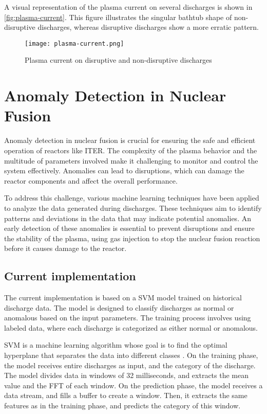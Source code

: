 A visual representation of the plasma current on several discharges is shown in \autoref{fig:plasma-current}. This figure illustrates the singular bathtub shape of non-disruptive discharges, whereas disruptive discharges show a more erratic pattern.

\begin{figure}[H]
    \centering
    \texttt{[image: plasma-current.png]}
    \caption{Plasma current on disruptive and non-disruptive discharges}
    \label{fig:plasma-current}
\end{figure}

\section{Anomaly Detection in Nuclear Fusion}

Anomaly detection in nuclear fusion is crucial for ensuring the safe and efficient operation of reactors like \ac{ITER}. The complexity of the plasma behavior and the multitude of parameters involved make it challenging to monitor and control the system effectively. Anomalies can lead to disruptions, which can damage the reactor components and affect the overall performance.

To address this challenge, various machine learning techniques have been applied to analyze the data generated during discharges. These techniques aim to identify patterns and deviations in the data that may indicate potential anomalies. An early detection of these anomalies is essential to prevent disruptions and ensure the stability of the plasma, using gas injection to stop the nuclear fusion reaction before it causes damage to the reactor.

\subsection{Current implementation}

The current implementation is based on a \ac{SVM} model trained on historical discharge data. The model is designed to classify discharges as normal or anomalous based on the input parameters. The training process involves using labeled data, where each discharge is categorized as either normal or anomalous.

\ac{SVM} is a machine learning algorithm whose goal is to find the optimal hyperplane that separates the data into different classes \autocite{6524743}. On the training phase, the model receives entire discharges as input, and the category of the discharge. The model divides data in windows of 32 milliseconds, and extracts the mean value and the \ac{FFT} of each window. On the prediction phase, the model receives a data stream, and fills a buffer to create a window. Then, it extracts the same features as in the training phase, and predicts the category of this window.

